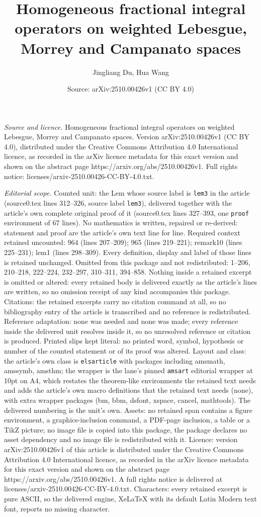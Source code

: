 \documentclass[10pt,a4paper]{amsart}
\title[Homogeneous fractional integral operators on weighted Lebesg]{Homogeneous fractional integral operators on weighted Lebesgue, Morrey and Campanato spaces}
\author{Jingliang Du, Hua Wang}
\date{Source: arXiv:2510.00426v1 (CC BY 4.0)}
\begin{document}
\maketitle

\noindent\emph{Source and licence.} Homogeneous fractional integral operators on weighted Lebesgue, Morrey and Campanato spaces. Version arXiv:2510.00426v1 (CC BY 4.0), distributed under the Creative Commons Attribution 4.0 International licence, as recorded in the arXiv licence metadata for this exact version and shown on the abstract page https://arxiv.org/abs/2510.00426v1. Full rights notice: licenses/arxiv-2510.00426-CC-BY-4.0.txt.\par\smallskip

\noindent\textit{Editorial scope.} Counted unit: the Lem whose source label is \texttt{lem3} in the article (source0.tex lines 312--326, source label \texttt{lem3}), delivered together with the article's own complete original proof of it (source0.tex lines 327--393, one \texttt{proof} environment of 67 lines). No mathematics is written, repaired or re-derived: statement and proof are the article's own text line for line. Required context retained uncounted: 964 (lines 207--209); 965 (lines 219--221); remark10 (lines 225--231); lem1 (lines 298--309). Every definition, display and label of those lines is retained unchanged. Omitted from this package and not redistributed: 1--206, 210--218, 222--224, 232--297, 310--311, 394--858. Nothing inside a retained excerpt is omitted or altered: every retained body is delivered exactly as the article's lines are written, so no omission receipt of any kind accompanies this package. Citations: the retained excerpts carry no citation command at all, so no bibliography entry of the article is transcribed and no reference is redistributed. Reference adaptation: none was needed and none was made; every reference inside the delivered unit resolves inside it, so no unresolved reference or citation is produced. Printed slips kept literal: no printed word, symbol, hypothesis or number of the counted statement or of its proof was altered. Layout and class: the article's own class is \texttt{elsarticle} with packages including amsmath, amssymb, amsthm; the wrapper is the lane's pinned \texttt{amsart} editorial wrapper at 10pt on A4, which restates the theorem-like environments the retained text needs and adds the article's own macro definitions that the retained text needs (none), with extra wrapper packages (bm, bbm, dsfont, xspace, cancel, mathtools). The delivered numbering is the unit's own. Assets: no retained span contains a figure environment, a graphics-inclusion command, a PDF-page inclusion, a table or a TikZ picture; no image file is copied into this package, the package declares no asset dependency and no image file is redistributed with it. Licence: version arXiv:2510.00426v1 of this article is distributed under the Creative Commons Attribution 4.0 International licence, as recorded in the arXiv licence metadata for this exact version and shown on the abstract page https://arxiv.org/abs/2510.00426v1. A full rights notice is delivered at licenses/arxiv-2510.00426-CC-BY-4.0.txt. Characters: every retained excerpt is pure ASCII, so the delivered engine, XeLaTeX with its default Latin Modern text font, reports no missing character.
\end{document}
